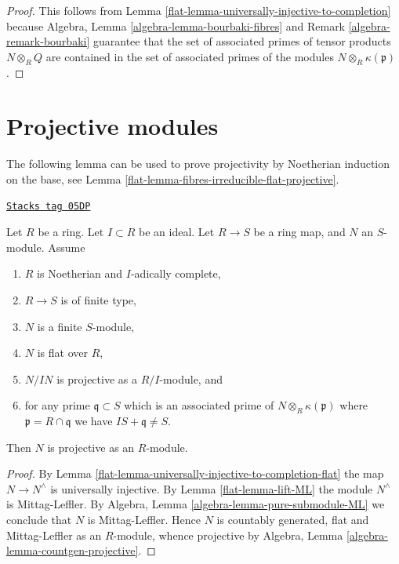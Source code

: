 \begin{proof}

This follows from
Lemma \ref{flat-lemma-universally-injective-to-completion}
because
Algebra, Lemma
\ref{algebra-lemma-bourbaki-fibres} and
Remark \ref{algebra-remark-bourbaki}
guarantee that the set of associated primes of tensor products
$N \otimes_R Q$ are contained in the set of associated primes of
the modules $N \otimes_R \kappa(\mathfrak p)$.
\end{proof}

\section{Projective modules}
\label{flat-section-projective}
The following lemma can be used to prove projectivity by
Noetherian induction on the base, see
Lemma \ref{flat-lemma-fibres-irreducible-flat-projective}.

\begin{lemma}
\label{flat-lemma-flat-pure-over-complete-projective}
\href{https://stacks.math.columbia.edu/tag/05DP}{\texttt{Stacks tag 05DP}}

Let $R$ be a ring.
Let $I \subset R$ be an ideal.
Let $R \to S$ be a ring map, and $N$ an $S$-module.
Assume
\begin{enumerate}
\item $R$ is Noetherian and $I$-adically complete,
\item $R \to S$ is of finite type,
\item $N$ is a finite $S$-module,
\item $N$ is flat over $R$,
\item $N/IN$ is projective as a $R/I$-module, and
\item for any prime $\mathfrak q \subset S$ which is an associated prime of
$N \otimes_R \kappa(\mathfrak p)$ where $\mathfrak p = R \cap \mathfrak q$
we have $IS + \mathfrak q \not = S$.
\end{enumerate}
Then $N$ is projective as an $R$-module.
\end{lemma}

\begin{proof}

By
Lemma \ref{flat-lemma-universally-injective-to-completion-flat}
the map $N \to N^\wedge$ is universally injective.
By
Lemma \ref{flat-lemma-lift-ML}
the module $N^\wedge$ is Mittag-Leffler.
By
Algebra, Lemma \ref{algebra-lemma-pure-submodule-ML}
we conclude that $N$ is Mittag-Leffler.
Hence $N$ is countably generated, flat and Mittag-Leffler as an $R$-module,
whence projective by
Algebra, Lemma \ref{algebra-lemma-countgen-projective}.
\end{proof}

